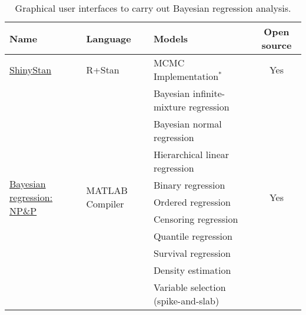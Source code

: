 

\begin{table}[!ht]
\caption{Graphical user interfaces to carry out Bayesian regression analysis.} \label{tab:software}
{\small{
\begin{tabular}{|l|l|l|c|}
\hline
\multicolumn{1}{|l|}{\textbf{Name}}                              & \multicolumn{1}{l|}{\textbf{Language}}       & \multicolumn{1}{l|}{\textbf{Models}}                                         & \textbf{Open source}                                                       \\ \hline
    \href{https://github.com/stan-dev/shinystan/graphs/contributors}{ShinyStan}                                                     & R+Stan                                       & MCMC Implementation$^*$ & Yes                                                                \\ \hline
     \multirow{10}{*}{\href{https://georgek.people.uic.edu/BayesSoftware.html}{Bayesian regression: NP\&P}}                                                     & \multirow{10}{*}{MATLAB Compiler}                                       & Bayesian infinite-mixture regression & \multirow{10}{*}{Yes}                                                                 \\
     & & Bayesian normal regression &\\
     & & Hierarchical linear regression &\\
     & & Binary regression &\\
     & & Ordered regression &\\
     & & Censoring regression &\\
     & & Quantile regression &\\
     & & Survival regression &\\
     & & Density estimation &\\
     & & Variable selection (spike-and-slab)&\\
     

\end{tabular}}}
\end{table}

